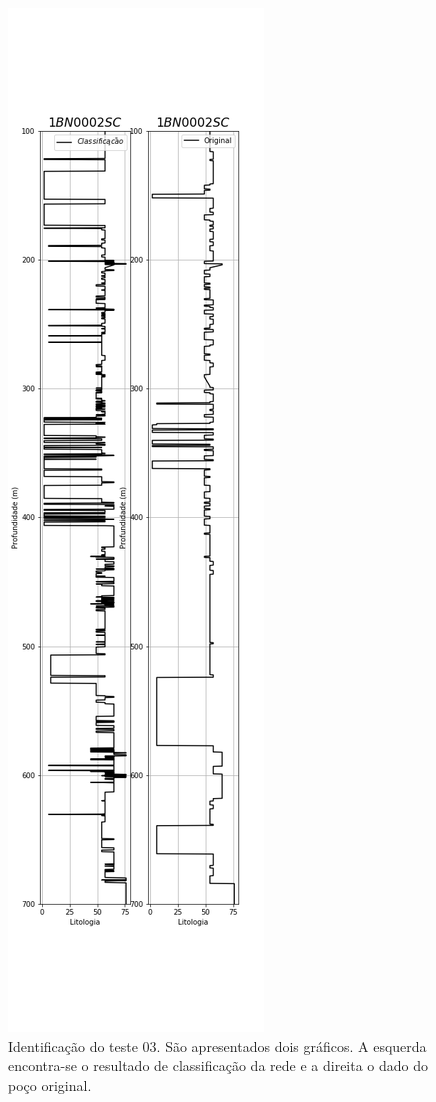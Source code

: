 \begin{figure}[H]
	\centering
	\includegraphics[scale=0.4]{Imagens/result03.png}
	\caption{Identificação do teste 03. São apresentados dois gráficos. A esquerda encontra-se o resultado de classificação da rede e a direita o dado do poço original.}
	\label{IDt03}
\end{figure} 


